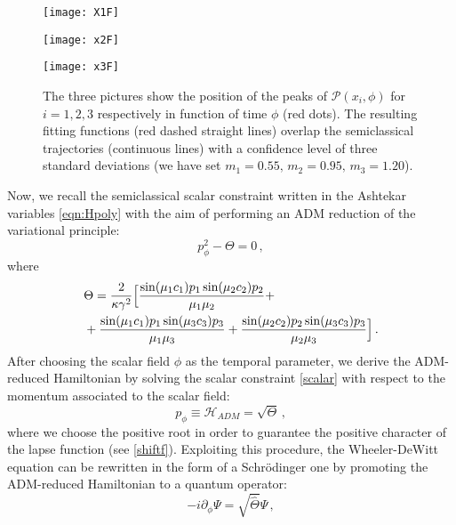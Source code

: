 \documentclass[aps,prd,twocolumn,nofootinbib,superscriptaddress]{revtex4-2}
\begin{document}
\begin{figure*}
	\begin{minipage}{3.4cm}
		\texttt{[image: X1F]}
	\end{minipage}
	\qquad\qquad\qquad
	\begin{minipage}{3.4cm}
		\texttt{[image: x2F]}
	\end{minipage}
	\qquad\qquad\qquad
	\begin{minipage}{3.4cm}
		\texttt{[image: x3F]}
	\end{minipage}
	\qquad\qquad\qquad\quad
	\caption{The three pictures show the position of the peaks of $\mathcal{P}(x_i,\phi)$ for $i=1,2,3$ respectively in function of time $\phi$ (red dots). The resulting fitting functions (red dashed straight lines) overlap the semiclassical trajectories (continuous lines) with a confidence level of three standard deviations (we have set $m_1=0.55,\,m_2=0.95,\,m_3=1.20$).}
	\label{qpeak}
\end{figure*}
Now, we recall the semiclassical scalar constraint written in the Ashtekar variables \eqref{eqn:Hpoly} with the aim of performing an ADM reduction of the variational principle:
\begin{equation}
	\label{scalar}
	p_{\phi}^{2}-\Theta=0\,,
\end{equation}
where
\begin{align}
	&\Theta={2\over\kappa\gamma^{2}}\Big[ {\sin(\mu_1c_1)p_1\sin(\mu_2c_2)p_2\over\mu_1\mu_2}+\\&+{\sin(\mu_1c_1)p_1\sin(\mu_3c_3)p_3\over\mu_1\mu_3}+{\sin(\mu_2c_2)p_2\sin(\mu_3c_3)p_3\over\mu_2\mu_3}\Big]\,.
\end{align}
After choosing the scalar field $\phi$ as the temporal parameter, we derive the ADM-reduced Hamiltonian by solving the scalar constraint \eqref{scalar} with respect to the momentum associated to the scalar field:
\begin{equation}
	p_{\phi}\equiv\mathcal{H}_{ADM}=\sqrt{\Theta}\,,
	\label{ADM}
\end{equation}
where we choose the positive root in order to guarantee the positive character of the lapse function (see \eqref{shiftf}).
Exploiting this procedure, the Wheeler-DeWitt equation can be rewritten in the form of a Schr\"odinger one by promoting the ADM-reduced Hamiltonian to a quantum operator:
\begin{equation}
	\label{eqn:schro}
	-i\partial_{\phi}\Psi=\sqrt{\hat{\Theta}}\Psi\,,
\end{equation}
\end{document}
